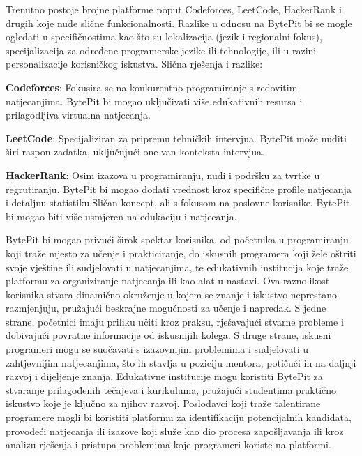 		Trenutno postoje brojne platforme poput Codeforces, LeetCode,
		HackerRank i drugih koje nude slične funkcionalnosti. Razlike
		u odnosu na BytePit bi se mogle ogledati u specifičnostima kao
		što su lokalizacija (jezik i regionalni fokus), specijalizacija
		za određene programerske jezike ili tehnologije, ili u razini
		personalizacije korisničkog iskustva.
		Slična rješenja i razlike:
		\begin{packed_item}
			\item \textbf{Codeforces}: Fokusira se na konkurentno programiranje s
			redovitim natjecanjima. BytePit bi mogao uključivati više edukativnih
			resursa i prilagodljiva virtualna natjecanja.
			\item \textbf{LeetCode}: Specijaliziran za pripremu tehničkih intervjua.
			BytePit može nuditi širi raspon zadatka, uključujući one van konteksta intervjua.
			\item \textbf{HackerRank}: Osim izazova u programiranju, nudi i podršku
			za tvrtke u regrutiranju. BytePit bi mogao dodati vrednost kroz specifične
			profile natjecanja i detaljnu statistiku.Sličan koncept, ali s fokusom na
			poslovne korisnike. BytePit bi mogao biti više usmjeren na edukaciju i natjecanja.\\
		\end{packed_item}


		BytePit bi mogao privući širok spektar korisnika, od početnika u programiranju 
		koji traže mjesto za učenje i prakticiranje, do iskusnih programera koji žele 
		oštriti svoje vještine ili sudjelovati u natjecanjima, te edukativnih institucija 
		koje traže platformu za organiziranje natjecanja ili kao alat u nastavi. Ova 
		raznolikost korisnika stvara dinamično okruženje u kojem se znanje i iskustvo 
		neprestano razmjenjuju, pružajući beskrajne mogućnosti za učenje i napredak. 
		S jedne strane, početnici imaju priliku učiti kroz praksu, rješavajući stvarne 
		probleme i dobivajući povratne informacije od iskusnijih kolega. S druge strane, 
		iskusni programeri mogu se suočavati s izazovnijim problemima i sudjelovati u 
		zahtjevnijim natjecanjima, što ih stavlja u poziciju mentora, potičući ih na 
		daljnji razvoj i dijeljenje znanja. Edukativne institucije mogu koristiti BytePit 
		za stvaranje prilagođenih tečajeva i kurikuluma, pružajući studentima praktično 
		iskustvo koje je ključno za njihov razvoj. Poslodavci koji traže talentirane 
		programere mogli bi koristiti platformu za identifikaciju potencijalnih kandidata, 
		provodeći natjecanja ili izazove koji služe kao dio procesa zapošljavanja ili kroz 
		analizu rješenja i pristupa problemima koje programeri koriste na platformi.
		\\


